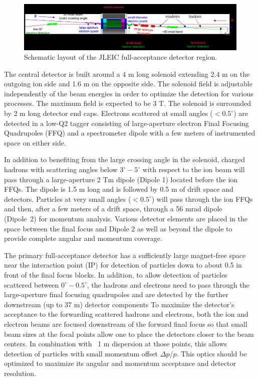 \begin{figure}
\centering
\includegraphics[width=.75\textwidth]{../../img/detector_schematic.jpg}
\caption{Schematic layout of the JLEIC full-acceptance detector region.}
\label{fig:detector_concept}
\end{figure}

The central detector is built around a 4 m long solenoid extending 2.4 m on the outgoing ion side and 1.6 m on the opposite side. The solenoid field is adjustable independently of the beam energies in order to optimize the detection for various processes. The maximum field is expected to be 3 T. The solenoid is surrounded by 2 m long detector end caps. Electrons scattered at small angles ($<0.5^{\circ}$) are detected in a low-Q2 tagger consisting of large-aperture electron Final Focusing Quadrupoles (FFQ) and a spectrometer dipole with a few meters of instrumented space on either side.

In addition to benefiting from the large crossing angle in the solenoid, charged hadrons with scattering angles below $3^{\circ}-5^{\circ}$ with respect to the ion beam will pass through a large-aperture 2 Tm dipole (Dipole 1) located before the ion FFQs. The dipole is 1.5 m long and is followed by 0.5 m of drift space and detectors. Particles at very small angles ($<0.5^{\circ}$)  will pass through the ion FFQs and then, after a few meters of a drift space, through a 56 mrad dipole (Dipole 2) for momentum analysis. Various detector elements are placed in the space between the final focus and Dipole 2 as well as beyond the dipole to provide complete angular and momentum coverage.

The primary full-acceptance detector has a sufficiently large magnet-free space near the interaction point (IP) for detection of particles down to about 0.5 in front of the final focus blocks. In addition, to allow detection of particles scattered between $0^{\circ}-0.5^{\circ}$, the hadrons and electrons need to pass through the large-aperture final focusing quadrupoles and are detected by the further downstream (up to 37 m) detector components %
To maximize the detector’s acceptance to the forwarding scattered hadrons and electrons, both the ion and electron beams are focused downstream of the forward final focus so that small beam sizes at the focal points allow one to place the detectors closer to the beam centers. In combination with ~1 m dispersion at those points, this allows detection of particles with small momentum offset $\Delta p/p$. This optics should be optimized to maximize its angular and momentum acceptance and detector resolution. 

